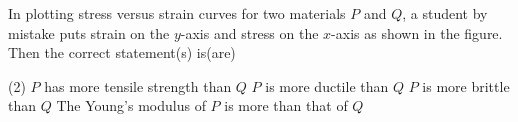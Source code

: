 
\item In plotting stress versus strain curves for two materials \(P\) and \(Q\), a student by mistake puts strain on the \(y\)-axis and stress on the \(x\)-axis as shown in the figure. Then the correct statement(s) is(are)
        \begin{tasks}(2)
            \task \(P\) has more tensile strength than \(Q\)
            \task \(P\) is more ductile than \(Q\)
            \task \(P\) is more brittle than \(Q\)
            \task The Young's modulus of \(P\) is more than that of \(Q\)
        \end{tasks}
    \begin{center}
    \end{center}
